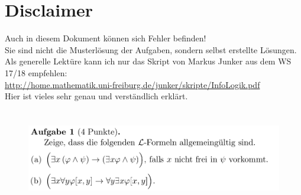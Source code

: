 \documentclass[a4paper]{scrartcl}
\begin{document}
\section*{Disclaimer}%
\label{sec:disclaimer}
Auch in diesem Dokument können sich Fehler befinden!\\
Sie sind nicht die Musterlösung der Aufgaben, sondern selbst erstellte Lösungen.\\

Als generelle Lektüre kann ich nur das Skript von Markus Junker aus dem WS 17/18 empfehlen:\\
\url{http://home.mathematik.uni-freiburg.de/junker/skripte/InfoLogik.pdf}\\
Hier ist vieles sehr genau und verständlich erklärt.%

\section*{}%
\label{sec:aufgabe_1}

    \begin{figure}[H]
        \includegraphics[scale=0.3]{./A-1.png}
        \label{fig:}
    \end{figure}
\end{document}
